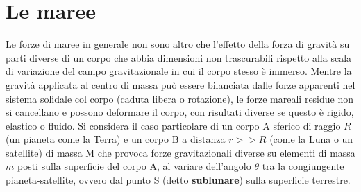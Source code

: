 \documentclass[a4paper, oneside]{book}
\begin{document}
\section{Le maree}
Le forze di maree in generale non sono altro che l'effetto della forza di gravità
su parti diverse di un corpo che abbia dimensioni non trascurabili rispetto alla scala 
di variazione del campo gravitazionale in cui il corpo 
stesso è immerso. Mentre la gravità applicata al centro di massa può essere 
bilanciata dalle forze apparenti nel sistema solidale col corpo
(caduta libera o rotazione), le forze mareali residue non si cancellano e possono deformare 
il corpo, con risultati diverse se questo è rigido, elastico o fluido.
Si considera il caso particolare di un corpo A sferico di raggio $R$ 
(un pianeta come la Terra) e un corpo B a distanza $r >> R$ (come la Luna o un satellite)
di massa M che provoca forze gravitazionali diverse su elementi di massa $m$ posti 
sulla superficie del corpo A, al variare dell'angolo $\theta$ tra 
la congiungente pianeta-satellite, ovvero dal punto S (detto \textbf{sublunare}) 
sulla superficie terrestre.
\end{document}
